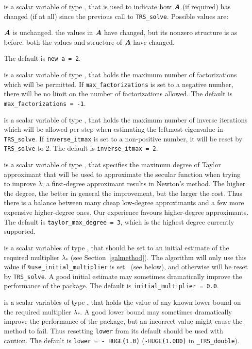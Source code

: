 \documentclass{galahad}
\newcommand{\packagename}{TRS}
\newcommand{\fullpackagename}{\libraryname\_\packagename}
\begin{document}
\begin{description}
 is a scalar variable of type \integer, that is used
to indicate how ${\bm{A}}$ (if required) has changed (if at all) since the previous
call to {\tt \packagename\_solve}. Possible values are:
\begin{description}
 ${\bm{A}}$ is unchanged.
 the values in ${\bm{A}}$ have changed, but its nonzero structure
is as before.
 both the values and structure of ${\bm{A}}$ have changed.
\end{description}
The default is {\tt new\_a = 2}.

 is a scalar variable of type \integer,
that holds the maximum number of factorizations which will be permitted.
If {\tt max\_factorizations} is set to a negative number, there will be
no limit on the number of factorizations allowed.
The default is {\tt max\_factorizations = -1}.

 is a scalar variable of type \integer, that holds
the maximum number of inverse iterations which will be allowed per step
when estimating the leftmost eigenvalue in {\tt \packagename\_solve}.
If {\tt inverse\_itmax} is set to a non-positive number, it will be reset by
{\tt \packagename\_solve} to 2.
The default is {\tt inverse\_itmax = 2}.

 is a scalar variable of type \integer,
that specifies the maximum degree of Taylor approximant that will be used
to approximate the secular function when trying to improve $\lambda$;
a first-degree approximant results in Newton's method.
The higher the degree, the better in general the improvement, but the larger the
cost. Thus there is a balance between many cheap low-degree approximants
and a few more expensive higher-degree ones. Our experience favours
higher-degree approximants.
The default is {\tt taylor\_max\_degree = 3}, which is the highest degree
currently supported.

 is a scalar variables of type \realdp, that should
be set to an initial estimate of the required multiplier $\lambda_*$
(see Section~\ref{galmethod}). The algorithm will only use this value
if {\tt \%use\_initial\_multiplier} is set \true\ (see below), and otherwise
will be reset by {\tt \packagename\_solve}. A good initial estimate
may sometimes dramatically improve the performance of the package.
The default is {\tt initial\_multiplier = 0.0}.

 is a scalar variables of type \realdp, that holds the value
of any known lower bound on the required multiplier $\lambda_*$. A good lower
bound may sometimes dramatically improve the performance of the package, but
an incorrect value might cause the method to fail. Thus resetting
{\tt lower} from its default should be used with caution.
The default is {\tt lower = - HUGE(1.0)}
({\tt -HUGE(1.0D0)} in {\tt \fullpackagename\_double}).


\end{description}
\end{document}
